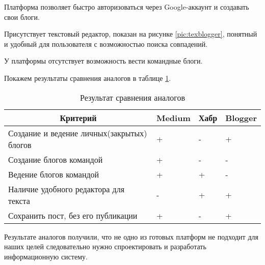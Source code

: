 Платформа позволяет быстро авторизоваться через Google-аккаунт и создавать свои блоги.

Присутствует текстовый редактор, показан на рисунке \ref{pic:texblogger}, понятный и удобный для пользователя с возможностью поиска совпадений.


У платформы отсутствует возможность вести командные блоги.

Покажем результаты сравнения аналогов в таблице \ref{tabular:analogi}.

\begin{table}[H]
	\caption{Результат сравнения аналогов}
	\label{tabular:analogi}
	\begin{center}
		\begin{tabular}{|l|l|l|l|}
			\hline
			\multicolumn{1}{|c|}{Критерий}             & \multicolumn{1}{c|}{Medium} & \multicolumn{1}{c|}{Хабр} & \multicolumn{1}{c|}{Blogger} \\ \hline
			Создание и ведение личных(закрытых) блогов & +                           & -                         & +                            \\ \hline
			Создание блогов командой                   & +                           & -                         & -                            \\ \hline
			Ведение блогов командой                    & +                           & +                         & -                            \\ \hline
			Наличие удобного редактора для текста      & -                           & +                         & +                            \\ \hline
			Сохранить пост, без его публикации         & +                           & -                         & +                            \\ \hline
		\end{tabular}
	\end{center}
\end{table}
Результате аналогов получили, что не одно из готовых платформ не подходит для наших целей следовательно нужно спроектировать и разработать информационную систему.



\pagebreak